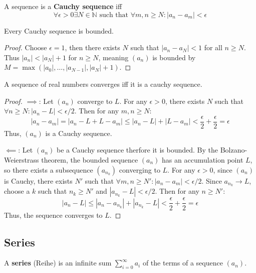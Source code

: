 \begin{definition}
    A sequence is a \textbf{Cauchy sequence} iff 
    $$\forall \epsilon \gt 0 \exists N \in \mathbb{N} \text{ such that } \forall m, n \ge N : |a_n - a_m| \lt \epsilon$$
\end{definition}

\begin{theorem}
    Every Cauchy sequence is bounded.
\end{theorem}

\begin{proof}
    Choose $\epsilon = 1$, then there exists $N$ such that $|a_n - a_{N}| \lt 1$ for all $n \ge N$. Thus $|a_n| \lt |a_N| + 1$ for $n \ge N$, meaning $(a_n)$ is bounded by $M = \max(|a_0|, \dots, |a_{N-1}|, |a_N|+1)$.
\end{proof}

\begin{theorem}
    A sequence of real numbers converges iff it is a cauchy sequence.
\end{theorem}

\begin{proof}
    $\implies$: Let $(a_n)$ converge to $L$. For any $\epsilon \gt 0$, there exists $N$ such that $\forall n \ge N: |a_n - L| \lt \epsilon / 2$.
    Then for any $m, n \ge N$:
    $$|a_n - a_m| = |a_n - L + L - a_m| \le |a_n - L| + |L - a_m| \lt \frac{\epsilon}{2} + \frac{\epsilon}{2} = \epsilon$$
    Thus, $(a_n)$ is a Cauchy sequence.
    
    $\impliedby$: Let $(a_n)$ be a Cauchy sequence therfore it is bounded. By the Bolzano-Weierstrass theorem, the bounded sequence $(a_n)$ has an accumulation point $L$, so there exists a subsequence $(a_{n_k})$ converging to $L$.
    For any $\epsilon \gt 0$, since $(a_n)$ is Cauchy, there exists $N'$ such that $\forall m, n \ge N': |a_n - a_m| \lt \epsilon / 2$.
    Since $a_{n_k} \to L$, choose a $k$ such that $n_k \ge N'$ and $|a_{n_k} - L| \lt \epsilon / 2$.
    Then for any $n \ge N'$:
    $$|a_n - L| \le |a_n - a_{n_k}| + |a_{n_k} - L| \lt \frac{\epsilon}{2} + \frac{\epsilon}{2} = \epsilon$$
    Thus, the sequence converges to $L$.
\end{proof}

\subsection{Series}

\begin{definition}
    A \textbf{series} (Reihe) is an infinite sum $\sum_{i=0}^\infty a_i$ of the terms of a sequence $(a_n)$.
\end{definition}

